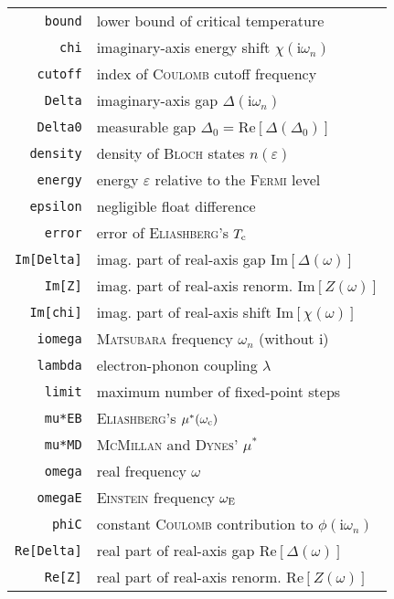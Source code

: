 \documentclass[twocolumn]{article}
\def\I{\mathrm i}
\def\sub#1{\sb{\mathrm{#1}}}
\let\epsilon\varepsilon
\let\Delta\varDelta
\def\Re{\mathrm{Re}}
\def\Im{\mathrm{Im}}
\newlength\gap
\let\name\textsc
\begin{document}
   \begin{table}[b]
      \centering
      \begin{tabular}{r l}
         \verb|bound| & lower bound of critical temperature \\
         \verb|chi| & imaginary-axis energy shift $\chi(\I \omega_n)$ \\
         \verb|cutoff| & index of \name{Coulomb} cutoff frequency \\
         \verb|Delta| & imaginary-axis gap $\Delta(\I \omega_n)$ \\
         \verb|Delta0| & measurable gap $\Delta_0 = \Re[\Delta(\Delta_0)]$ \\
         \verb|density| & density of \name{Bloch} states $n(\epsilon)$ \\
         \verb|energy| & energy $\epsilon$ relative to the \name{Fermi} level \\
         \verb|epsilon| & negligible float difference \\
         \verb|error| & error of \name{Eliashberg}'s $T \sub c$ \\
         \verb|Im[Delta]| & imag. part of real-axis gap $\Im[\Delta(\omega)]$ \\
         \verb|Im[Z]| & imag. part of real-axis renorm. $\Im[Z(\omega)]$ \\
         \verb|Im[chi]| & imag. part of real-axis shift $\Im[\chi(\omega)]$ \\
         \verb|iomega| & \name{Matsubara} frequency $\omega_n$ (without $\I$) \\
         \verb|lambda| & electron-phonon coupling $\lambda$ \\
         \verb|limit| & maximum number of fixed-point steps \\
         \verb|mu*EB| & \name{Eliashberg}'s $\mu^*(\omega \sub c)$ \\
         \verb|mu*MD| & \name{McMillan} and \name{Dynes}' $\mu^*$ \\
         \verb|omega| & real frequency $\omega$ \\
         \verb|omegaE| & \name{Einstein} frequency $\omega \sub E$ \\
         \verb|phiC|
            & constant \name{Coulomb} contribution to $\phi(\I \omega_n)$ \\
         \verb|Re[Delta]| & real part of real-axis gap $\Re[\Delta(\omega)]$ \\
         \verb|Re[Z]| & real part of real-axis renorm. $\Re[Z(\omega)]$ \\

\end{tabular}
\end{table}
\end{document}
